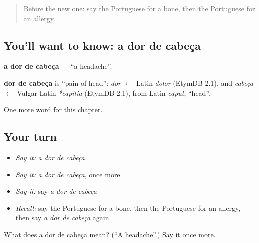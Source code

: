 \begin{quote}
Before the new one: say the Portuguese for a bone, then the Portuguese for an allergy.
\end{quote}

\subsection*{You'll want to know: a dor de cabeça}
\textbf{a dor de cabeça} — \textquotedblleft{}a headache\textquotedblright{}.

\begin{cousinweb}
\textbf{dor de cabeça} is \textquotedblleft{}pain of head\textquotedblright{}: \emph{dor} $\leftarrow$ Latin \emph{dolor} (EtymDB 2.1), and \emph{cabeça} $\leftarrow$ Vulgar Latin \emph{*capitia} (EtymDB 2.1), from Latin \emph{caput}, \textquotedblleft{}head\textquotedblright{}.
\end{cousinweb}

\begin{grammarlens}[title={What you've built}]
One more word for this chapter.
\end{grammarlens}

\subsection*{Your turn}
\begin{itemize}
\raggedright
  \item \emph{Say it:} \emph{a dor de cabeça}
  \item \emph{Say it:} \emph{a dor de cabeça}, once more
  \item \emph{Say it:} say \emph{a dor de cabeça}
  \item \emph{Recall:} say the Portuguese for a bone, then the Portuguese for an allergy, then say \emph{a dor de cabeça} again
\end{itemize}

\begin{tcolorbox}[breakable,colback=teal!4,colframe=teal!35!black,title={Before you move on}]
What does a dor de cabeça mean? (\textquotedblleft{}A headache\textquotedblright{}.) Say it once more.
\end{tcolorbox}
